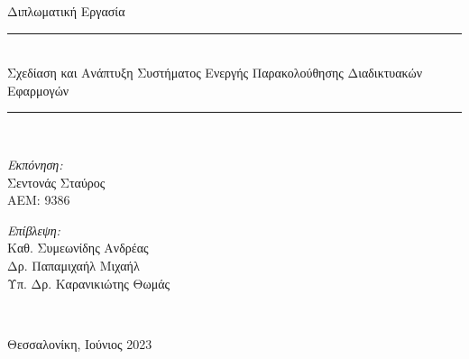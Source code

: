 \begin{titlepage}
  \begin{center}
    \Large Διπλωματική Εργασία \\[0.8cm]

    \rule{450pt}{4pt} \\[0.4cm]
    {\fontsize{20.26pt}{1em}\selectfont Σχεδίαση και Ανάπτυξη Συστήματος Ενεργής Παρακολούθησης Διαδικτυακών Εφαρμογών}

    \rule{350pt}{4pt} \\[4cm]

    \begin{minipage}{0.4\textwidth}
      \begin{flushleft} \normalsize
        \emph{Εκπόνηση:} \\
        Σεντονάς Σταύρος \\
        ΑΕΜ: 9386
      \end{flushleft}
    \end{minipage}
    \begin{minipage}{0.4\textwidth}
      \begin{flushright} \normalsize
        \emph{Επίβλεψη:} \\
        Καθ. Συμεωνίδης Ανδρέας\\
        Δρ. Παπαμιχαήλ Μιχαήλ \\
        Υπ. Δρ. Καρανικιώτης Θωμάς \\
      \end{flushright}
    \end{minipage}
    \\[1cm]
    \vfill

    \large Θεσσαλονίκη, Ιούνιος 2023

  \end{center}
\end{titlepage}
